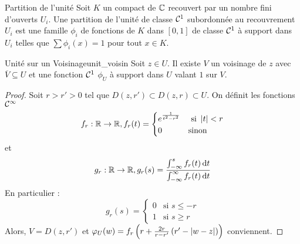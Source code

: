 \documentclass{cours}
\begin{document}
\begin{définition}{Partition de l'unité}{}
    Soit $K$ un compact de $\mathbb{C}$ recouvert par un nombre fini d'ouverts $U_{i}$. Une partition de l'unité de classe $\mathcal{C}^{1}$ subordonnée au recouvrement $U_{i}$ est une famille $\phi_{i}$ de fonctions de $K$ dans $[0, 1]$ de classe $\mathcal{C}^{1}$ à support dans $U_{i}$ telles que $\sum \phi_{i}(x) = 1$ pour tout $x \in K$. 
\end{définition}

\begin{lemme}{Unité sur un Voisinage}{unit_voisin}
    Soit $z \in U$. Il existe $V$ un voisinage de $z$ avec $\overline{V}\subseteq U$ et une fonction $\mathcal{C}^{1}$ $\phi_{U}$ à support dans $U$ valant $1$ sur $V$. 
\end{lemme}
\begin{proof}
    Soit $r > r'>0$ tel que $D(z, r') \subset D(z, r) \subset U$. On définit les fonctions $\mathcal{C}^{\infty}$ 
    \[
        f_{r} : \mathbb{R} \to \mathbb{R}, f_{r}(t) = \begin{cases}
            e^{\frac{1}{t^{2}-r^{2}}} & \text{ si } \left|t\right| < r\\
            0 & \text{sinon}
        \end{cases}
    \]
    et 
    \[
        g_{r} : \mathbb{R} \to \mathbb{R}, g_{r}(s) = \frac{\int_{-\infty}^{s}f_{r}(t){\rm \, d} t}{\int_{- \infty}^{\infty}f_{r}(t){\rm \, d} t}
    \]
    En particulier : 
    \[
        g_{r}(s) = \begin{cases}
            0 & \text{si } s \leq -r\\
            1 & \text{si } s \geq r
        \end{cases}
    \]
    Alors, $V = D(z, r')$ et $\varphi_{U}(w) = f_{r}\left(r + \frac{2r}{r-r'}\left(r'-\left|w - z\right|\right)\right)$ conviennent. 
\end{proof}
\end{document}
